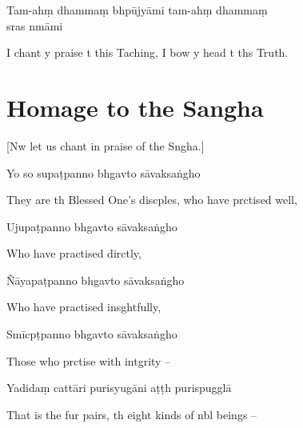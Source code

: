 Tam-ahṃ dhammaṃ bhpūjyāmi tam-ahṃ dhammaṃ \\s{}ras nmāmi

\begin{english}
  I chant y praise t this Taching, I bow y head t ths Truth.
\end{english}


\chapter{Homage to the Sangha}

\begin{leader}
\end{leader}

\begin{english}
  [Nw let us chant in praise of the Sngha.]
\end{english}

Yo so supaṭpanno bhgavto sāvaksaṅgho

\begin{english}
  They are th Blessed One's discples, who have prctised well,
\end{english}

Ujupaṭpanno bhgavto sāvaksaṅgho

\begin{english}
  Who have practised dirctly,
\end{english}

Ñāyapaṭpanno bhgavto sāvaksaṅgho

\begin{english}
  Who have practised insghtfully,
\end{english}

Smīcpṭpanno bhgavto sāvaksaṅgho

\begin{english}
  Those who prctise with intgrity --
\end{english}

Yadidaṃ cattāri purisyugāni aṭṭh purispugglā

\begin{english}
  That is the fur pairs, th eight kinds of nbl beings --
\end{english}

